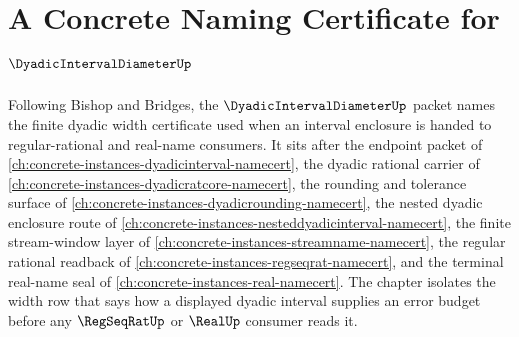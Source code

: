 \chapter{A Concrete Naming Certificate for $\DyadicIntervalDiameterUp$}
\label{ch:concrete-instances-dyadic-interval-diameter-namecert}

Following Bishop and Bridges, the $\DyadicIntervalDiameterUp$ packet names the finite dyadic width certificate used when an interval enclosure is handed to regular-rational and real-name consumers. It sits after the endpoint packet of \autoref{ch:concrete-instances-dyadicinterval-namecert}, the dyadic rational carrier of \autoref{ch:concrete-instances-dyadicratcore-namecert}, the rounding and tolerance surface of \autoref{ch:concrete-instances-dyadicrounding-namecert}, the nested dyadic enclosure route of \autoref{ch:concrete-instances-nesteddyadicinterval-namecert}, the finite stream-window layer of \autoref{ch:concrete-instances-streamname-namecert}, the regular rational readback of \autoref{ch:concrete-instances-regseqrat-namecert}, and the terminal real-name seal of \autoref{ch:concrete-instances-real-namecert}. The chapter isolates the width row that says how a displayed dyadic interval supplies an error budget before any $\RegSeqRatUp$ or $\RealUp$ consumer reads it.

